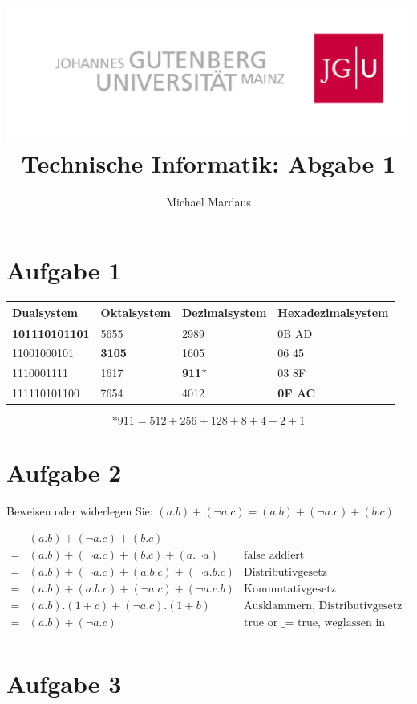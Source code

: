 \documentclass[10pt,a4paper]{scrartcl}
\author{Michael Mardaus}
\title{\includegraphics[scale=0.2]{logo_schriftzug}\\ Technische Informatik:
Abgabe 1}
\begin{document}
\maketitle

\section{Aufgabe 1}

\begin{tabular}{|l|l|l|l|}\hline
Dualsystem & Oktalsystem & Dezimalsystem & Hexadezimalsystem \\\hline\hline
\textbf{101110101101} & 5655 & 2989 & 0B AD \\\hline
11001000101 & \textbf{3105} & 1605 & 06 45 \\\hline
1110001111 & 1617 & \textbf{911}$\ast$ & 03 8F \\\hline
111110101100 & 7654 & 4012 & \textbf{0F AC} \\\hline
\end{tabular}
\[\ast 911 = 512 + 256 + 128 + 8 + 4 + 2 + 1\] 
 

\section{Aufgabe 2}
Beweisen oder widerlegen Sie: $(a.b) + (\neg a.c) = (a.b) + (\neg a.c) + (b.c)$

\begin{eqnarray*}
& (a.b) + (\neg a.c) + (b.c) &\\
= & (a.b) + (\neg a.c) + (b.c) + (a.\neg a) & \text{false addiert}\\
= & (a.b) + (\neg a.c) + (a.b.c) + (\neg a.b.c) & \text{Distributivgesetz}\\
= & (a.b)  + (a.b.c)+ (\neg a.c) + (\neg a.c.b) & \text{Kommutativgesetz}\\
= & (a.b).(1 + c) + (\neg a.c).(1 + b) & \text{Ausklammern, Distributivgesetz}\\
= & (a.b) + (\neg a.c) & \text{true or \_ = true, weglassen in Produkt}\\
\end{eqnarray*}


\section{Aufgabe 3}
\end{document}
